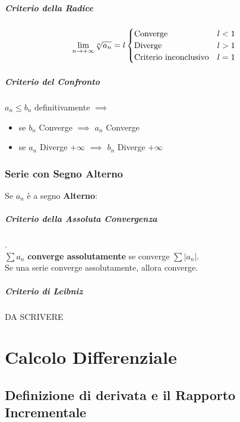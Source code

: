 \documentclass[12pt, a4paper, openany]{book}
\begin{document}
\paragraph*{Criterio della Radice} 
\[
	\underset{n \to +\infty}{\lim} \sqrt[n]{a_n} = l
	\begin{cases}
		\text{Converge} &  l<1\\
		\text{Diverge} & l>1\\
		\text{Criterio inconclusivo} & l=1
	\end{cases}
\]

\paragraph*{Criterio del Confronto}
$a_n\leq b_n$ definitivamente $\implies$
\begin{itemize}
	\item se $b_n$ Converge $\implies$  $a_n$ Converge
	\item se $a_n$ Diverge $+\infty$ $\implies$ $b_n$ Diverge $+\infty$
\end{itemize}

\subsection*{Serie con Segno Alterno}
Se $a_n$ è a segno \textbf{Alterno}: 

\paragraph{Criterio della Assoluta Convergenza}.\\
$\sum a_n$ \textbf{converge assolutamente} se converge $\sum |a_n|$.\\
Se una serie converge assolutamente, allora converge.

\paragraph{Criterio di Leibniz}
DA SCRIVERE

\chapter{Calcolo Differenziale}



\section{Definizione di derivata e il Rapporto Incrementale}
\end{document}
